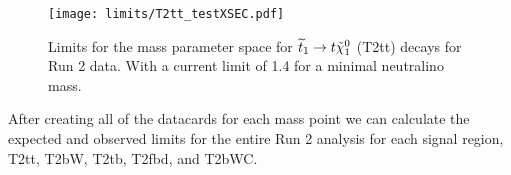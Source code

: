 \begin{figure}
	\begin{center}
  \texttt{[image: limits/T2tt\_testXSEC.pdf]}
	\end{center}
	\caption[Run 2: T2tt Limits]{Limits for the mass parameter space for $\widetilde{t}_1\rightarrow t \tilde{\chi}^{0}_{1}$ (T2tt) decays for Run 2 data. With a current limit of 1.4 \TeV{} for a minimal neutralino mass.
	 }
	\label{fig:Run2-T2tt-limits}
\end{figure}

After creating all of the datacards for each mass point we can calculate the expected and observed limits for the entire Run 2 analysis for each signal region, T2tt, T2bW, T2tb, T2fbd, and T2bWC. 